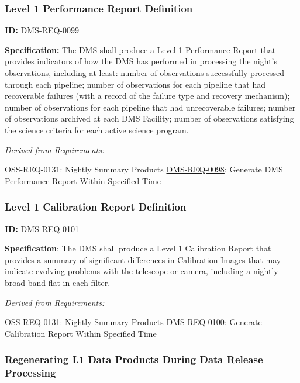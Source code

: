 \documentclass[SE,toc,lsstdraft]{lsstdoc}
\begin{document}
\subsubsection{Level 1 Performance Report Definition}

\label{DMS-REQ-0099}
\textbf{ID:} DMS-REQ-0099

\textbf{Specification:} The DMS shall produce a Level 1 Performance Report that provides indicators of how the DMS has performed in processing the night's observations, including at least: number of observations successfully processed through each pipeline; number of observations for each pipeline that had recoverable failures (with a record of the failure type and recovery mechanism); number of observations for each pipeline that had unrecoverable failures; number of observations archived at each DMS Facility; number of observations satisfying the science criteria for each active science program.






\emph{Derived from Requirements:}

OSS-REQ-0131:
Nightly Summary Products \newline
\hyperref[DMS-REQ-0098]{DMS-REQ-0098}:
Generate DMS Performance Report Within Specified Time \newline


\subsubsection{Level 1 Calibration Report Definition}

\label{DMS-REQ-0101}
\textbf{ID:} DMS-REQ-0101

\textbf{Specification}: The DMS shall produce a Level 1 Calibration Report that provides a summary of significant differences in Calibration Images that may indicate evolving problems with the telescope or camera, including a nightly broad-band flat in each filter.






\emph{Derived from Requirements:}

OSS-REQ-0131:
Nightly Summary Products \newline
\hyperref[DMS-REQ-0100]{DMS-REQ-0100}:
Generate Calibration Report Within Specified Time \newline


\subsubsection{Regenerating L1 Data Products During Data Release Processing}
\end{document}
